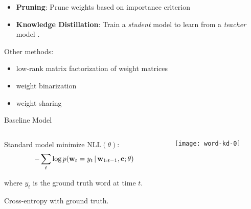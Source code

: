 

\begin{frame}
  \centerline{}
\air

\begin{itemize}
\item \textbf{Pruning}: Prune weights based on importance criterion 
\cite{LeCun1990,Han2016}
\item \textbf{Knowledge Distillation}: Train a \textit{student} model to learn 
from a \textit{teacher} model \cite{Bucila2006,Ba2014,Hinton2015}.
\end{itemize}
\air
Other methods: 
\begin{itemize}
\item low-rank matrix factorization of weight matrices \cite{Denton2014}
\item weight binarization \cite{Lin2016}
\item weight sharing \cite{Chen2015}
\end{itemize}
\end{frame}





\begin{frame}{Baseline Model}
\air 


\begin{columns}
\begin{column}{6.5cm}
Standard model minimize $\text{NLL}(\theta)$: 
\air
$$-\sum_t \log p(\mathbf{w}_t=y_t \,|\, \mathbf{w}_{1:t-1}, \mathbf{c} ; \theta)$$

where $y_t$ is the ground truth word at time $t$.

\air 

Cross-entropy with ground truth.

\end{column}
\begin{column}{5.5cm}
\texttt{[image: word-kd-0]}
\end{column}
\end{columns}
\end{frame}

